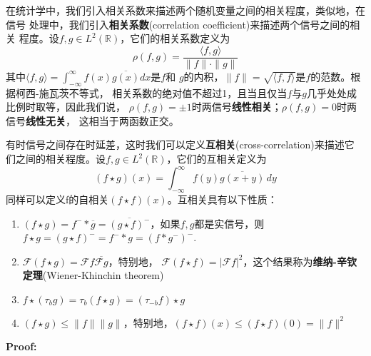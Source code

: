 \documentclass{ctexbook}
\begin{document}
在统计学中，我们引入相关系数来描述两个随机变量之间的相关程度，类似地，在信号
处理中，我们引入\textbf{相关系数}(correlation coefficient)来描述两个信号之间的相关
程度。设$f,g\in L^2(\mathbb{R})$，它们的相关系数定义为
\begin{equation}
    \rho(f,g)=\frac{\langle f,g\rangle}{\|f\|\cdot\|g\|}
\end{equation}
其中$\langle f,g\rangle=\int_{-\infty}^{\infty}f(x)\overline{g(x)}dx$是$f$和
$g$的内积，$\|f\|=\sqrt{\langle f,f\rangle}$是$f$的范数。根据柯西-施瓦茨不等式，
相关系数的绝对值不超过1，且当且仅当$f$与$g$几乎处处成比例时取等，因此我们说，
$\rho(f,g)=\pm 1$时两信号\textbf{线性相关}；$\rho(f,g)=0$时两信号\textbf{线性无关}，
这相当于两函数正交。

有时信号之间存在时延差，这时我们可以定义\textbf{互相关}(cross-correlation)来描述它
们之间的相关程度。设$f,g\in L^2(\mathbb{R})$，它们的互相关定义为
\begin{equation}
    (f\star g)(x)=\int_{-\infty}^{\infty}f(y)\overline{g(x+y)}\,dy
\end{equation}
同样可以定义f的自相关$(f\star f)(x)$。互相关具有以下性质：
\begin{enumerate}
    \item $(f\star g) =f^-* \overline{g}=\overline{(g\star f)^-}$，如果$f,g$都是实信号，则$f\star g = (g\star f)^- =f^- *g=(f*g^-)^-$.
    \item $\mathcal{F} (f\star g) =\mathcal{F} f\overline{\mathcal{F} g}$，特别地，
          $\mathcal{F} (f\star f) =|\mathcal{F} f|^2$，这个结果称为\textbf{维纳-辛钦定理}(Wiener-Khinchin theorem)
    \item $f\star (\tau_b g)=\tau_{b} (f\star g)=(\tau_{-b}f)\star g$
    \item $(f\star g)\leq\|f\|\|g\|$，特别地，$(f\star f)(x)\leq (f\star f)(0)=\|f\|^2$
\end{enumerate}
\textbf{Proof:}
\end{document}

